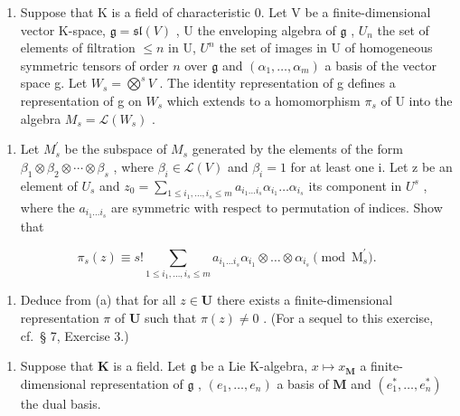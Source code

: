 \begin{enumerate}
\def\labelenumi{\arabic{enumi}.}
\setcounter{enumi}{4}
\tightlist
\item
  Suppose that K is a field of characteristic 0. Let V be a finite-dimensional vector K-space, \(\mathfrak{g} = \mathfrak{sl}(V)\) , U the enveloping algebra of \(\mathfrak{g}\) , \(U_n\) the set of elements of filtration \(\leqslant n\) in U, \(U^n\) the set of images in U of homogeneous symmetric tensors of order \(n\) over \(\mathfrak{g}\) and \((\alpha_1, \ldots, \alpha_m)\) a basis of the vector space g. Let \(W_{s} = \bigotimes^{s} V\) . The identity representation of g defines a representation of g on \(W_{s}\) which extends to a homomorphism \(\pi_s\) of U into the algebra \(M_s = \mathcal{L}(W_s)\) .
\end{enumerate}

\begin{enumerate}
\def\labelenumi{(\alph{enumi})}
\tightlist
\item
  Let \(M_{s}^{\prime}\) be the subspace of \(M_{s}\) generated by the elements of the form \(\beta_{1} \otimes \beta_{2} \otimes \cdots \otimes \beta_{s}\) , where \(\beta_{i} \in \mathcal{L}(V)\) and \(\beta_{i} = 1\) for at least one i. Let z be an element of \(U_{s}\) and \(z_{0} = \sum_{1 \leqslant i_{1}, \ldots, i_{s} \leqslant m} a_{i_{1} \ldots i_{s}} \alpha_{i_{1}} \ldots \alpha_{i_{s}}\) its component in \(U^{s}\) , where the \(a_{i_{1} \ldots i_{s}}\) are symmetric with respect to permutation of indices. Show that
\end{enumerate}

\[
\pi_ {s} (z) \equiv s! \sum_ {1 \leqslant i _ {1}, \dots , i _ {s} \leqslant m} a _ {i _ {1} \dots i _ {s}} \alpha_ {i _ {1}} \otimes \dots \otimes \alpha_ {i _ {s}} \pmod {\mathrm{M} _ {s} ^ {\prime}}.
\]

\begin{enumerate}
\def\labelenumi{(\alph{enumi})}
\setcounter{enumi}{1}
\tightlist
\item
  Deduce from (a) that for all \(z \in \mathbf{U}\) there exists a finite-dimensional representation \(\pi\) of \(\mathbf{U}\) such that \(\pi(z) \neq 0\) . (For a sequel to this exercise, cf.~§ 7, Exercise 3.)
\end{enumerate}

\begin{enumerate}
\def\labelenumi{\arabic{enumi}.}
\setcounter{enumi}{5}
\tightlist
\item
  Suppose that \(\mathbf{K}\) is a field. Let \(\mathfrak{g}\) be a Lie K-algebra, \(x \mapsto x_{\mathbf{M}}\) a finite-dimensional representation of \(\mathfrak{g}\) , \((e_1, \ldots, e_n)\) a basis of \(\mathbf{M}\) and \((e_1^*, \ldots, e_n^*)\) the dual basis.
\end{enumerate}

